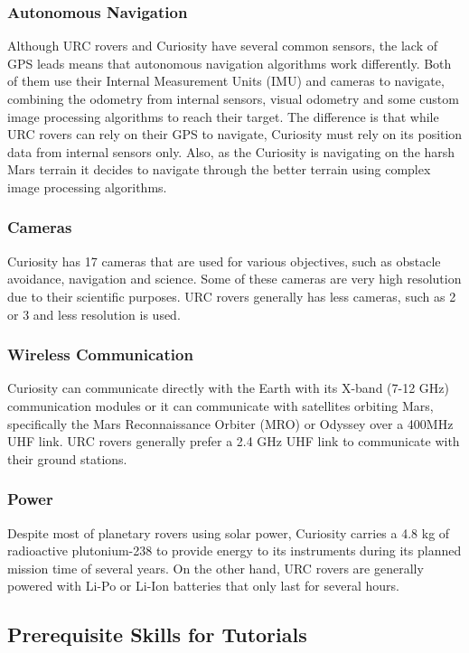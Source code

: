 \documentclass[runningheads,a4paper]{llncs}
\begin{document}
\subsubsection*{Autonomous Navigation} Although URC rovers and Curiosity have several common sensors, the lack of GPS leads means that autonomous navigation algorithms work differently. Both of them use their Internal Measurement Units (IMU) and cameras to navigate, combining the odometry from internal sensors, visual odometry and some custom image processing algorithms to reach their target. The difference is that while URC rovers can rely on their GPS to navigate, Curiosity must rely on its position data from internal sensors only. Also, as the Curiosity is navigating on the harsh Mars terrain it decides to navigate through the better terrain using complex image processing algorithms. 

\subsubsection*{Cameras} Curiosity has 17 cameras that are used for various objectives, such as obstacle avoidance, navigation and science. Some of these cameras are very high resolution due to their scientific purposes. URC rovers generally has less cameras, such as 2 or 3 and less resolution is used. 

\subsubsection*{Wireless Communication} Curiosity can communicate directly with the Earth with its X-band (7-12 GHz) communication modules or it can communicate with satellites orbiting Mars, specifically the Mars Reconnaissance Orbiter  (MRO) or Odyssey over a 400MHz UHF link. URC rovers generally prefer a 2.4 GHz UHF link to communicate with their ground stations.

\subsubsection*{Power} Despite most of planetary rovers using solar power, Curiosity carries a 4.8 kg of radioactive plutonium-238 to provide energy to its instruments during its planned mission time of several years. On the other hand, URC rovers are generally powered with Li-Po or Li-Ion batteries that only last for several hours.

\subsection{Prerequisite Skills for Tutorials}
\end{document}
